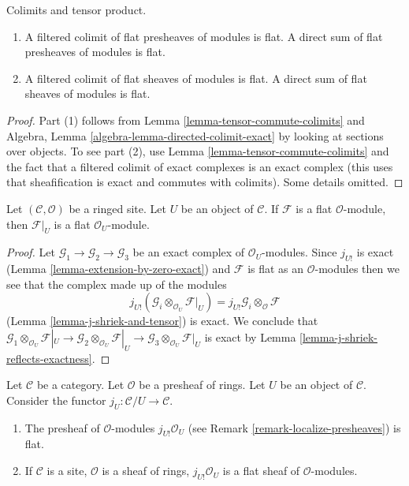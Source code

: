 \begin{lemma}
\label{lemma-colimits-flat}
Colimits and tensor product.
\begin{enumerate}
\item A filtered colimit of flat presheaves of modules
is flat. A direct sum of flat presheaves of modules is flat.
\item A filtered colimit of flat sheaves of modules is flat.
A direct sum of flat sheaves of modules is flat.
\end{enumerate}
\end{lemma}

\begin{proof}
Part (1) follows from Lemma \ref{lemma-tensor-commute-colimits} and
Algebra, Lemma \ref{algebra-lemma-directed-colimit-exact}
by looking at sections over objects.
To see part (2), use Lemma \ref{lemma-tensor-commute-colimits} and
the fact that a filtered colimit of exact
complexes is an exact complex (this uses that sheafification is exact
and commutes with colimits). Some details omitted.
\end{proof}

\begin{lemma}
\label{lemma-restriction-flat}
Let $(\mathcal{C}, \mathcal{O})$ be a ringed site.
Let $U$ be an object of $\mathcal{C}$.
If $\mathcal{F}$ is a flat $\mathcal{O}$-module, then
$\mathcal{F}|_U$ is a flat $\mathcal{O}_U$-module.
\end{lemma}

\begin{proof}
Let $\mathcal{G}_1 \to \mathcal{G}_2 \to \mathcal{G}_3$ be
an exact complex of $\mathcal{O}_U$-modules.
Since $j_{U!}$ is exact (Lemma \ref{lemma-extension-by-zero-exact})
and $\mathcal{F}$ is flat as an $\mathcal{O}$-modules
then we see that the complex made up of the modules
$$
j_{U!}(\mathcal{G}_i \otimes_{\mathcal{O}_U} \mathcal{F}|_U) =
j_{U!}\mathcal{G}_i \otimes_\mathcal{O} \mathcal{F}
$$
(Lemma \ref{lemma-j-shriek-and-tensor}) is exact. We conclude that
$\mathcal{G}_1 \otimes_{\mathcal{O}_U} \mathcal{F}|_U \to
\mathcal{G}_2 \otimes_{\mathcal{O}_U} \mathcal{F}|_U \to
\mathcal{G}_3 \otimes_{\mathcal{O}_U} \mathcal{F}|_U$
is exact by
Lemma \ref{lemma-j-shriek-reflects-exactness}.
\end{proof}

\begin{lemma}
\label{lemma-j-shriek-flat}
Let $\mathcal{C}$ be a category.
Let $\mathcal{O}$ be a presheaf of rings.
Let $U$ be an object of $\mathcal{C}$.
Consider the functor $j_U : \mathcal{C}/U \to \mathcal{C}$.
\begin{enumerate}
\item The presheaf of $\mathcal{O}$-modules
$j_{U!}\mathcal{O}_U$ (see
Remark \ref{remark-localize-presheaves})
is flat.
\item If $\mathcal{C}$ is a site, $\mathcal{O}$ is a sheaf of rings,
$j_{U!}\mathcal{O}_U$ is a flat sheaf of $\mathcal{O}$-modules.
\end{enumerate}
\end{lemma}

